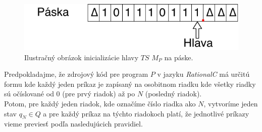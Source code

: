 \documentclass[11pt,a4paper]{article}
\begin{document}
\begin{figure}[!h]
    \centering
    \includegraphics[scale=1]{img/tape_head.pdf}
    \caption{Ilustračný obrázok inicializácie hlavy $TS$ $M_P$ na páske.}
    \label{fig:tape_init}
\end{figure}

Predpokladajme, že zdrojový kód pre program $P$ v jazyku \textit{RationalC} má určitú formu kde každý jeden príkaz je zapísaný na osobitnom riadku kde všetky riadky sú očíslované od $0$ (pre prvý riadok) až po $N$ (posledný riadok).\\

Potom, pre každý jeden riadok, kde označíme číslo riadka ako $N$, vytvoríme jeden stav $q_N \in Q$ a pre každý príkaz na týchto riadokoch platí, že jednotlivé príkazy vieme previesť podľa nasledujúcich pravidiel.
\end{document}
